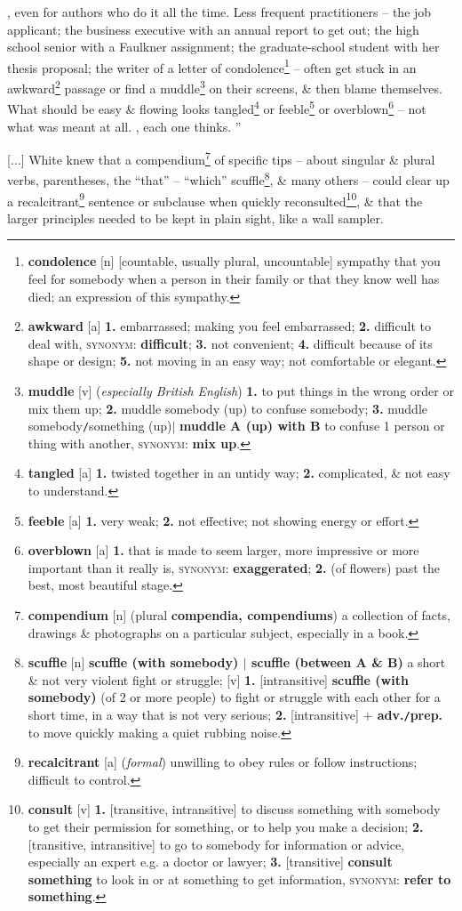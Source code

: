 \documentclass{article}
\begin{document}
, even for authors who do it all the time. Less frequent practitioners -- the job applicant; the business executive with an annual report to get out; the high school senior with a Faulkner assignment; the graduate-school student with her thesis proposal; the writer of a letter of condolence\footnote{{\bf condolence} [n] [countable, usually plural, uncountable] sympathy that you feel for somebody when a person in their family or that they know well has died; an expression of this sympathy.} -- often get stuck in an awkward\footnote{{\bf awkward} [a] {\bf 1.} embarrassed; making you feel embarrassed; {\bf 2.} difficult to deal with, \textsc{synonym}: {\bf difficult}; {\bf 3.} not convenient; {\bf 4.} difficult because of its shape or design; {\bf 5.} not moving in an easy way; not comfortable or elegant.} passage or find a muddle\footnote{{\bf muddle} [v] ({\it especially British English}) {\bf 1.} to put things in the wrong order or mix them up; {\bf 2.} muddle somebody (up) to confuse somebody; {\bf 3.} muddle somebody{\tt/}something (up)$|$ {\bf muddle A (up) with B} to confuse 1 person or thing with another, \textsc{synonym}: {\bf mix up}.} on their screens, \& then blame themselves. What should be easy \& flowing looks tangled\footnote{{\bf tangled} [a] {\bf 1.} twisted together in an untidy way; {\bf 2.} complicated, \& not easy to understand.} or feeble\footnote{{\bf feeble} [a] {\bf 1.} very weak; {\bf 2.} not effective; not showing energy or effort.} or overblown\footnote{{\bf overblown} [a] {\bf 1.} that is made to seem larger, more impressive or more important than it really is, \textsc{synonym}: {\bf exaggerated}; {\bf 2.} (of flowers) past the best, most beautiful stage.} -- not what was meant at all. , each one thinks. ''

[$\ldots$] White knew that a compendium\footnote{{\bf compendium} [n] (plural {\bf compendia, compendiums}) a collection of facts, drawings \& photographs on a particular subject, especially in a book.} of specific tips -- about singular \& plural verbs, parentheses, the ``that'' -- ``which'' scuffle\footnote{{\bf scuffle} [n] {\bf scuffle (with somebody) $|$ scuffle (between A \& B)} a short \& not very violent fight or struggle; [v] {\bf 1.} [intransitive] {\bf scuffle (with somebody)} (of 2 or more people) to fight or struggle with each other for a short time, in a way that is not very serious; {\bf 2.} [intransitive] {\bf $+$ adv.{\tt/}prep.} to move quickly making a quiet rubbing noise.}, \& many others -- could clear up a recalcitrant\footnote{{\bf recalcitrant} [a] ({\it formal}) unwilling to obey rules or follow instructions; difficult to control.} sentence or subclause when quickly reconsulted\footnote{{\bf consult} [v] {\bf 1.} [transitive, intransitive] to discuss something with somebody to get their permission for something, or to help you make a decision; {\bf 2.} [transitive, intransitive] to go to somebody for information or advice, especially an expert e.g. a doctor or lawyer; {\bf 3.} [transitive] {\bf consult something} to look in or at something to get information, \textsc{synonym}: {\bf refer to something}.}, \& that the larger principles needed to be kept in plain sight, like a wall sampler.
\end{document}
